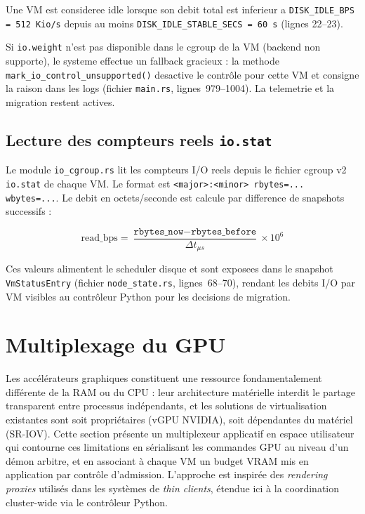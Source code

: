 Une VM est consideree idle lorsque son debit total est inferieur a \texttt{DISK\_IDLE\_BPS = 512~Kio/s} depuis au moins \texttt{DISK\_IDLE\_STABLE\_SECS = 60~s} (lignes 22--23).

Si \texttt{io.weight} n'est pas disponible dans le cgroup de la VM (backend non supporte), le systeme effectue un fallback gracieux : la methode \texttt{mark\_io\_control\_unsupported()} desactive le contrôle pour cette VM et consigne la raison dans les logs (fichier \texttt{main.rs}, lignes~979--1004). La telemetrie et la migration restent actives.

\subsection{Lecture des compteurs reels \texttt{io.stat}}
\label{subsec:io-stat}

Le module \texttt{io\_cgroup.rs} lit les compteurs I/O reels depuis le fichier cgroup v2 \texttt{io.stat} de chaque VM. Le format est \texttt{<major>:<minor> rbytes=... wbytes=...}. Le debit en octets/seconde est calcule par difference de snapshots successifs :

\begin{equation}
    \text{read\_bps} = \frac{\texttt{rbytes\_now} - \texttt{rbytes\_before}}{\Delta t_{\mu s}} \times 10^6
\end{equation}

Ces valeurs alimentent le scheduler disque et sont exposees dans le snapshot \texttt{VmStatusEntry} (fichier \texttt{node\_state.rs}, lignes~68--70), rendant les debits I/O par VM visibles au contrôleur Python pour les decisions de migration.

\section{Multiplexage du GPU}
\label{sec:gpu-multiplexer}

Les accélérateurs graphiques constituent une ressource fondamentalement différente de la RAM ou du CPU : leur architecture matérielle interdit le partage transparent entre processus indépendants, et les solutions de virtualisation existantes sont soit propriétaires (vGPU NVIDIA), soit dépendantes du matériel (SR-IOV). Cette section présente un multiplexeur applicatif en espace utilisateur qui contourne ces limitations en sérialisant les commandes GPU au niveau d'un démon arbitre, et en associant à chaque VM un budget VRAM mis en application par contrôle d'admission. L'approche est inspirée des \textit{rendering proxies} utilisés dans les systèmes de \textit{thin clients}, étendue ici à la coordination cluster-wide via le contrôleur Python.

